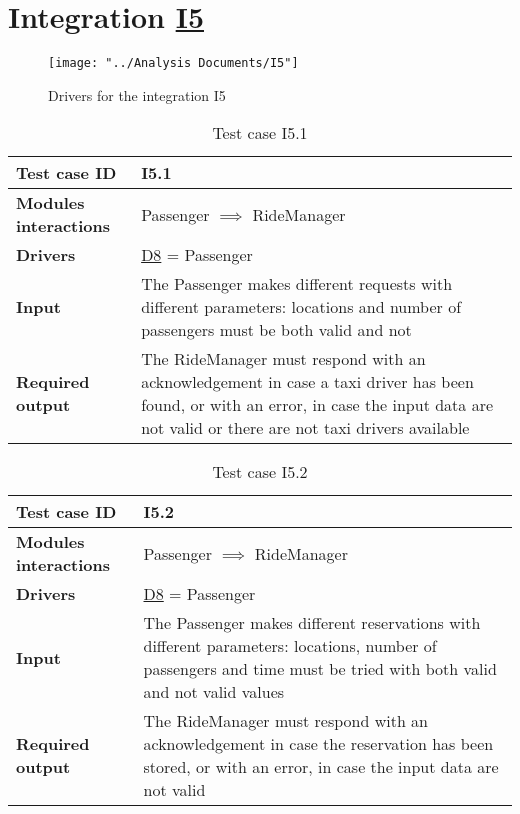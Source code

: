 \section{Integration \hyperref[I5]{I5} \label{int_I5}}
\begin{figure}[H]
\centering
\texttt{[image: "../Analysis Documents/I5"]}
\caption{Drivers for the integration I5}
\end{figure}

\begin{table}[H]
\begin{tabular}{ l | p{} }
\textbf{Test case ID} & I5.1 \\ \hline
\textbf{Modules interactions} & Passenger $\implies$ RideManager \\ \hline
\textbf{Drivers} &  \hyperref[D8]{D8} = Passenger \\ \hline
\textbf{Input} & The Passenger makes different requests with different parameters: locations and number of passengers must be both valid and not\\ \hline
\textbf{Required output} & The RideManager must respond with an acknowledgement in case a taxi driver has been found, or with an error, in case the input data are not valid or there are not taxi drivers available
\end{tabular}
\caption{Test case I5.1}
\end{table}

\begin{table}[H]
\begin{tabular}{ l | p{} }
\textbf{Test case ID} & I5.2 \\ \hline
\textbf{Modules interactions} & Passenger $\implies$ RideManager \\ \hline
\textbf{Drivers} &  \hyperref[D8]{D8} = Passenger \\ \hline
\textbf{Input} & The Passenger makes different reservations with different parameters: locations, number of passengers and time must be tried with both valid and not valid values\\ \hline
\textbf{Required output} & The RideManager must respond with an acknowledgement in case the reservation has been stored, or with an error, in case the input data are not valid
\end{tabular}
\caption{Test case I5.2}
\end{table}